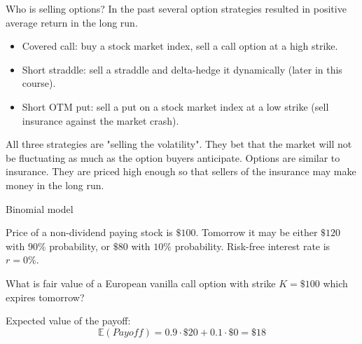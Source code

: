 \documentclass{beamer}
\begin{document}
\begin{frame}{Who is selling options?}
\justify
In the past several option strategies resulted in positive average return in the long run.

\justify
\begin{itemize}
\justifying
\item Covered call: buy a stock market index, sell a call option at a high strike.
\item Short straddle: sell a straddle and delta-hedge it dynamically (later in this course).
\item Short OTM put: sell a put on a stock market index at a low strike (sell insurance against the market crash).
\end{itemize}

\justify
All three strategies are "selling the volatility". They bet that the market will not be fluctuating as much as the option buyers anticipate. Options are similar to insurance. They are priced high enough so that sellers of the insurance may make money in the long run.
\end{frame}



\newcommand{\drawStockNode}[5]{

	\node (#5)
	[
		draw,
		rectangle,
		rounded corners,
		inner sep = 0pt,
		outer sep = 0pt,
		minimum width = 2.4cm,
		minimum height = 0.55cm,
		align = center
	]
	at (#3, #4)
	{
		\begin{tabular}{c|c}
		#1 & #2
		\end{tabular}
	};
}

\newcommand{\drawStockLink}[4]{

	\draw[
		->,
		>=triangle 90
	]
	(#1.east) -- (#2.west)
	node[
		pos = 0.5,
		anchor = #4
	]
	{#3};
}

\newcommand{\drawOneStepBinomialTree}{
	\drawStockNode{\$100}{?}{0}{0}{S0_node}
	\drawStockNode{\$120}{\$20}{4}{ 1}{Su_node}
	\drawStockNode{\$80}{\$0}{4}{-1}{Sd_node}
	
	\drawStockLink{S0_node}{Su_node}{$90\%$}{south east}	
	\drawStockLink{S0_node}{Sd_node}{$10\%$}{north east}
}

\begin{frame}{Binomial model}
\centering
{}

\justify
Price of a non-dividend paying stock is $\$100$. Tomorrow it may be either $\$120$ with $90\%$ probability, or $\$80$ with  $10\%$ probability. Risk-free interest rate is $r=0\%$.

\justify
What is fair value of a European vanilla call option with strike $K=\$100$ which expires tomorrow?

\justify
Expected value of the payoff:
$$\mathbb{E}(Payoff) = 0.9\cdot \$20 + 0.1\cdot \$0 = \$18 $$
\end{frame}
\end{document}
